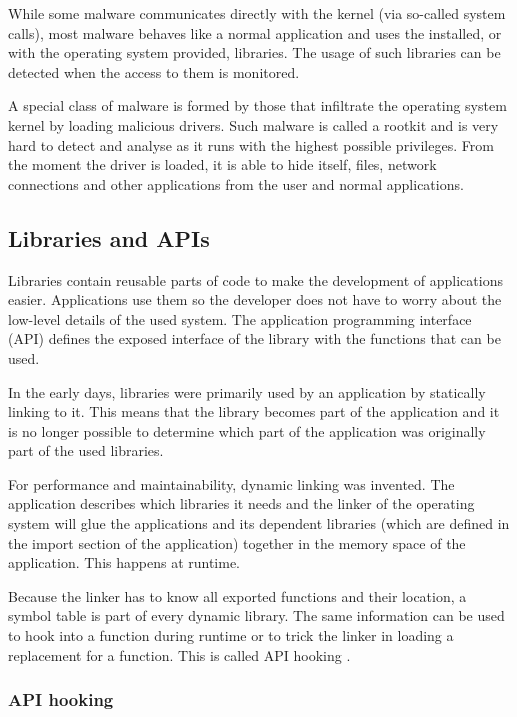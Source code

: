 While some malware communicates directly with the kernel (via so-called system calls), most malware \cite{MaliciousAPIs} behaves like a normal application and uses the installed, or with the operating system provided, libraries. The usage of such libraries can be detected when the access to them is monitored.

A special class of malware \cite{ZeroAccess,Gameover} is formed by those that infiltrate the operating system kernel by loading malicious drivers. Such malware is called a rootkit and is very hard to detect and analyse as it runs with the highest possible privileges. From the moment the driver is loaded, it is able to hide itself, files, network connections and other applications from the user and normal applications.

\subsection{Libraries and APIs}

Libraries contain reusable parts of code to make the development of applications easier. Applications use them so the developer does not have to worry about the low-level details of the used system. The application programming interface (API) defines the exposed interface of the library with the functions that can be used.

In the early days, libraries were primarily used by an application by statically linking to it. This means that the library becomes part of the application and it is no longer possible to determine which part of the application was originally part of the used libraries.

For performance and maintainability, dynamic linking was invented. The application describes which libraries it needs and the linker of the operating system will glue the applications and its dependent libraries (which are defined in the import section of the application) together in the memory space of the application. This happens at runtime. 

Because the linker has to know all exported functions and their location, a symbol table is part of every dynamic library. The same information can be used to hook into a function during runtime or to trick the linker in loading a replacement for a function. This is called API hooking \cite{APIHookingRevealed}.

\subsubsection{API hooking}

